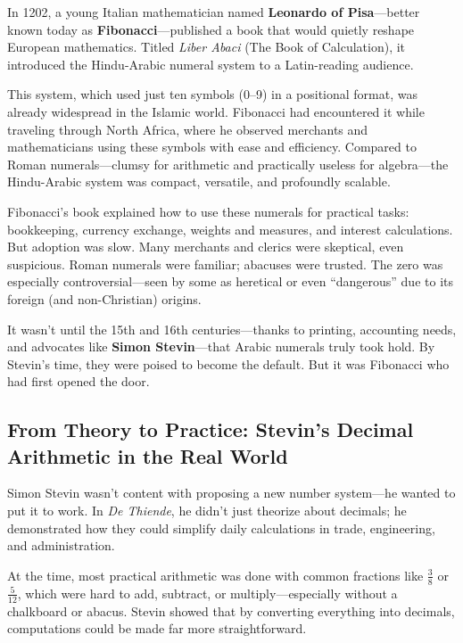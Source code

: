 \begin{tcolorbox}[title=Historical Sidebar: Fibonacci and the Numbers That Changed Everything, colback=gray!5, colframe=black]
    In 1202, a young Italian mathematician named \textbf{Leonardo of Pisa}—better known today as \textbf{Fibonacci}—published a book that would quietly reshape European mathematics. Titled \textit{Liber Abaci} (The Book of Calculation), it introduced the Hindu-Arabic numeral system to a Latin-reading audience. 
    
    This system, which used just ten symbols (0–9) in a positional format, was already widespread in the Islamic world. Fibonacci had encountered it while traveling through North Africa, where he observed merchants and mathematicians using these symbols with ease and efficiency. Compared to Roman numerals—clumsy for arithmetic and practically useless for algebra—the Hindu-Arabic system was compact, versatile, and profoundly scalable.
    
    Fibonacci's book explained how to use these numerals for practical tasks: bookkeeping, currency exchange, weights and measures, and interest calculations. But adoption was slow. Many merchants and clerics were skeptical, even suspicious. Roman numerals were familiar; abacuses were trusted. The zero was especially controversial—seen by some as heretical or even “dangerous” due to its foreign (and non-Christian) origins.
    
    It wasn’t until the 15th and 16th centuries—thanks to printing, accounting needs, and advocates like \textbf{Simon Stevin}—that Arabic numerals truly took hold. By Stevin’s time, they were poised to become the default. But it was Fibonacci who had first opened the door.
\end{tcolorbox}





\subsection{From Theory to Practice: Stevin’s Decimal Arithmetic in the Real World}

Simon Stevin wasn’t content with proposing a new number system—he wanted to put it to work. In \textit{De Thiende}, he didn’t just theorize about decimals; he demonstrated how they could simplify daily calculations in trade, engineering, and administration.

At the time, most practical arithmetic was done with common fractions like \( \frac{3}{8} \) or \( \frac{5}{12} \), which were hard to add, subtract, or multiply—especially without a chalkboard or abacus. Stevin showed that by converting everything into decimals, computations could be made far more straightforward.

